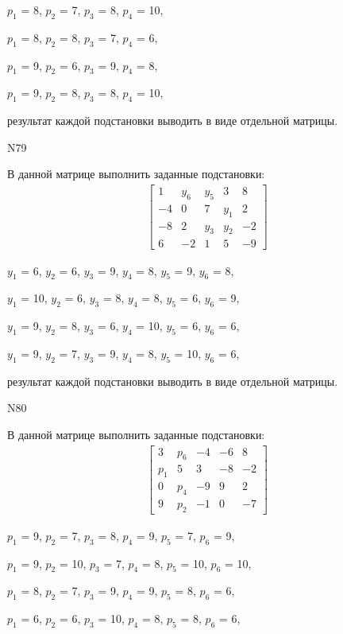 \documentclass[11pt]{report}
\begin{document}
$p_{1}$ = 8, $p_{2}$ = 7, $p_{3}$ = 8, $p_{4}$ = 10, 

$p_{1}$ = 8, $p_{2}$ = 8, $p_{3}$ = 7, $p_{4}$ = 6, 

$p_{1}$ = 9, $p_{2}$ = 6, $p_{3}$ = 9, $p_{4}$ = 8, 

$p_{1}$ = 9, $p_{2}$ = 8, $p_{3}$ = 8, $p_{4}$ = 10, 

результат каждой подстановки выводить в виде отдельной матрицы.

N79

В данной матрице выполнить заданные подстановки:
\begin{align*}
\left[\begin{matrix}1 & y_{6} & y_{5} & 3 & 8\\-4 & 0 & 7 & y_{1} & 2\\-8 & 2 & y_{3} & y_{2} & -2\\6 & -2 & 1 & 5 & -9\end{matrix}\right]
\end{align*}


$y_{1}$ = 6, $y_{2}$ = 6, $y_{3}$ = 9, $y_{4}$ = 8, $y_{5}$ = 9, $y_{6}$ = 8, 

$y_{1}$ = 10, $y_{2}$ = 6, $y_{3}$ = 8, $y_{4}$ = 8, $y_{5}$ = 6, $y_{6}$ = 9, 

$y_{1}$ = 9, $y_{2}$ = 8, $y_{3}$ = 6, $y_{4}$ = 10, $y_{5}$ = 6, $y_{6}$ = 6, 

$y_{1}$ = 9, $y_{2}$ = 7, $y_{3}$ = 9, $y_{4}$ = 8, $y_{5}$ = 10, $y_{6}$ = 6, 

результат каждой подстановки выводить в виде отдельной матрицы.

N80

В данной матрице выполнить заданные подстановки:
\begin{align*}
\left[\begin{matrix}3 & p_{6} & -4 & -6 & 8\\p_{1} & 5 & 3 & -8 & -2\\0 & p_{4} & -9 & 9 & 2\\9 & p_{2} & -1 & 0 & -7\end{matrix}\right]
\end{align*}


$p_{1}$ = 9, $p_{2}$ = 7, $p_{3}$ = 8, $p_{4}$ = 9, $p_{5}$ = 7, $p_{6}$ = 9, 

$p_{1}$ = 9, $p_{2}$ = 10, $p_{3}$ = 7, $p_{4}$ = 8, $p_{5}$ = 10, $p_{6}$ = 10, 

$p_{1}$ = 8, $p_{2}$ = 7, $p_{3}$ = 9, $p_{4}$ = 9, $p_{5}$ = 8, $p_{6}$ = 6, 

$p_{1}$ = 6, $p_{2}$ = 6, $p_{3}$ = 10, $p_{4}$ = 8, $p_{5}$ = 8, $p_{6}$ = 6, 
\end{document}

